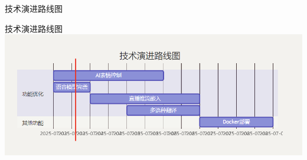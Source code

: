 \documentclass{beamer}
\begin{document}
	\begin{frame}{技术演进路线图}
		\begin{block}{技术演进路线图}
			\centering
			\includegraphics[width=\textwidth]{pic/gantt_roadmap.png}
		\end{block}
	\end{frame}
\end{document}
